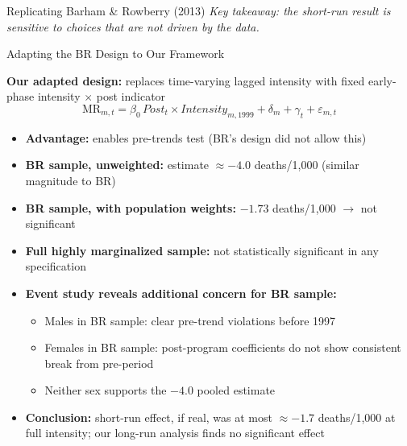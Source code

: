 \documentclass[aspectratio=169,usenames,dvipsnames]{beamer}
\begin{document}
\begin{frame}{Replicating Barham \& Rowberry (2013)}
\vspace{6pt}
\textit{Key takeaway: the short-run result is sensitive to choices that are not driven by the data.}

\end{frame}


\begin{frame}{Adapting the BR Design to Our Framework}\label{br_adapt}
\small

\textbf{Our adapted design:} replaces time-varying lagged intensity with fixed early-phase intensity $\times$ post indicator
\begin{equation*}
\text{MR}_{m,t} = \beta_0\,\textit{Post}_t \times \textit{Intensity}_{m,1999} + \delta_m + \gamma_t + \varepsilon_{m,t}
\end{equation*}

\vspace{6pt}

\begin{itemize}
  \item[$\circ$] \textbf{Advantage:} enables pre-trends test (BR's design did not allow this)
  \item[$\circ$] \textbf{BR sample, unweighted:} estimate $\approx -4.0$ deaths/1,000 (similar magnitude to BR)
  \item[$\circ$] \textbf{BR sample, with population weights:} $-1.73$ deaths/1,000 $\to$ not significant
  \item[$\circ$] \textbf{Full highly marginalized sample:} not statistically significant in any specification
  \vspace{6pt}
  \item[$\circ$] \textbf{Event study reveals additional concern for BR sample:}
    \begin{itemize}
      \item Males in BR sample: \textcolor{redUT}{clear pre-trend violations} before 1997
      \item Females in BR sample: post-program coefficients do not show consistent break from pre-period
      \item Neither sex supports the $-4.0$ pooled estimate
    \end{itemize}
  \vspace{6pt}
  \item[$\circ$] \textbf{Conclusion:} short-run effect, if real, was at most $\approx -1.7$ deaths/1,000 at full intensity; our long-run analysis finds no significant effect
\end{itemize}

\end{frame}
\end{document}
